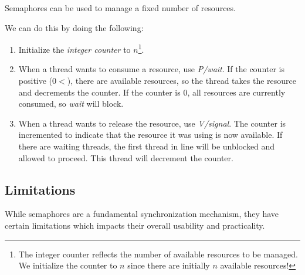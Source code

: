 \documentclass{report}
\newcommand{\exampleBegin}[1]{\begin{tcolorbox}[colback=blue!5!white,colframe=black!75!blue,title={Example:
      #1}]}
\newcommand{\exampleEnd}{\end{tcolorbox}}
\begin{document}
\exampleBegin{Counting}
Semaphores can be used to manage a fixed number of resources.

We can do this by doing the following:
\begin{enumerate}[label=\textit{(\roman*)}]
\item Initialize the \textit{integer counter} to $n$\footnote{The integer counter reflects the number
    of available resources to be managed. We initialize the counter to $n$ since there are initially
    $n$ available resources!}. 
\item When a thread wants to consume a resource, use \textit{P/wait}. If the counter is positive ($0
  <$), there are available resources, so the thread takes the resource and decrements the
  counter. If the counter is 0, all resources are currently consumed, so \textit{wait} will block.
\item When a thread wants to release the resource, use \textit{V/signal}. The counter is incremented
  to indicate that the resource it was using is now available. If there are waiting threads, the
  first thread in line will be unblocked and allowed to proceed. This thread will decrement the counter.
\end{enumerate}
\exampleEnd


\subsection{Limitations}
While semaphores are a fundamental synchronization mechanism, they have certain limitations which
impacts their overall usability and practicality.
\end{document}

